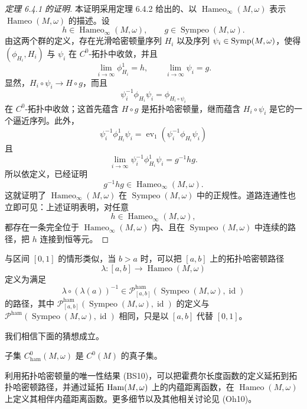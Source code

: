 \begin{proof}[定理 6.4.1 的证明]
本证明采用定理 6.4.2 给出的、以
$\operatorname{Hameo}_\infty(M,\omega)$ 表示 $\operatorname{Hameo}(M,\omega)$ 的描述。设
\[
 h\in\operatorname{Hameo}_\infty(M,\omega),
 \qquad
 g\in\operatorname{Sympeo}(M,\omega).
\]
由这两个群的定义，存在光滑哈密顿量序列
$H_i$ 以及序列 $\psi_i\in\operatorname{Symp}(M,\omega)$，使得
$(\phi_{H_i},H_i)$ 与 $\psi_i$ 在 $C^0$-拓扑中收敛，并且
\[
 \lim_{i\to\infty}\phi_{H_i}^1=h,
 \qquad
 \lim_{i\to\infty}\psi_i=g.
\]
显然，$H_i\circ\psi_i\to H\circ g$，而且
\[
 \psi_i^{-1}\phi_{H_i}\psi_i
 =\phi_{H_i\circ\psi_i}
\]
在 $C^0$-拓扑中收敛；这首先蕴含 $H\circ g$ 是拓扑哈密顿量，继而蕴含
$H_i\circ\psi_i$ 是它的一个逼近序列。此外，
\[
 \psi_i^{-1}\phi_{H_i}^1\psi_i
 =\operatorname{ev}_1(\psi_i^{-1}\phi_{H_i}\psi_i)
\]
且
\[
 \lim_{i\to\infty}\psi_i^{-1}\phi_{H_i}^1\psi_i
 =g^{-1}hg.
\]
所以依定义，已经证明
\[
 g^{-1}hg\in\operatorname{Hameo}_\infty(M,\omega).
\]
这就证明了 $\operatorname{Hameo}_\infty(M,\omega)$ 在
$\operatorname{Sympeo}(M,\omega)$ 中的正规性。道路连通性也立即可见：上述证明表明，对任意
\[
 h\in\operatorname{Hameo}_\infty(M,\omega),
\]
都存在一条完全位于 $\operatorname{Hameo}_\infty(M,\omega)$ 内、且在
$\operatorname{Sympeo}(M,\omega)$ 中连续的路径，把 $h$ 连接到恒等元。
\end{proof}

与区间 $[0,1]$ 的情形类似，当 $b>a$ 时，可以把
$[a,b]$ 上的拓扑哈密顿路径
\[
 \lambda:[a,b]\longrightarrow\operatorname{Hameo}(M,\omega)
\]
定义为满足
\begin{equation}
 \lambda\circ(\lambda(a))^{-1}
 \in\mathcal P_{[a,b]}^{\mathrm{ham}}
 (\operatorname{Sympeo}(M,\omega),\operatorname{id})
 \label{eq:topological-hamiltonian-path-general-interval}
\end{equation}
的路径，其中
$\mathcal P_{[a,b]}^{\mathrm{ham}}
(\operatorname{Sympeo}(M,\omega),\operatorname{id})$
的定义与
$\mathcal P^{\mathrm{ham}}
(\operatorname{Sympeo}(M,\omega),\operatorname{id})$
相同，只是以 $[a,b]$ 代替 $[0,1]$。

我们相信下面的猜想成立。

\begin{conjecture}\label{conj:hamiltonian-continuous-functions-proper}
子集 $C_{\mathrm{ham}}^0(M,\omega)$ 是 $C^0(M)$ 的真子集。
\end{conjecture}

利用拓扑哈密顿量的唯一性结果 (BS10)，可以把霍费尔长度函数的定义延拓到拓扑哈密顿路径，并通过延拓
$\operatorname{Ham}(M,\omega)$ 上的内蕴距离函数，在
$\operatorname{Hameo}(M,\omega)$ 上定义其相伴内蕴距离函数。更多细节以及其他相关讨论见 (Oh10)。

